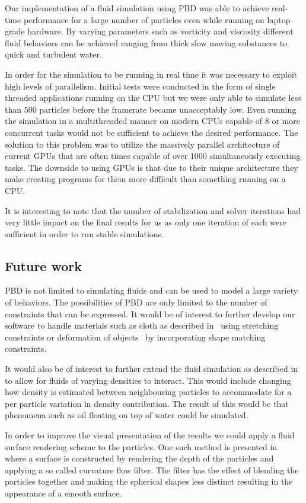 Our implementation of a fluid simulation using PBD was able
to achieve real-time performance for a large number of particles even while
running on laptop grade hardware. By varying parameters such as vorticity and
viscosity different fluid behaviors can be achieved ranging from thick slow
moving substances to quick and turbulent water.

In order for the simulation to be running in real time it was necessary to
exploit high levels of parallelism. Initial tests were conducted in the form
of single threaded applications running on the CPU but we were only able to
simulate less than 500 particles before the framerate became unacceptably low.
Even running the simulation in a multithreaded manner on modern CPUs capable of
8 or more concurrent tasks would not be sufficient to achieve the desired
performance. The solution to this problem was to utilize the massively parallel
architecture of current GPUs that are often times
capable of over 1000 simultaneously executing tasks. The downside to using GPUs
is that due to their unique architecture they make creating programs for them
more difficult than something running on a CPU.

It is interesting to note that the number of stabilization and solver iterations had very little impact on the final results for us as only one iteration of each were sufficient in order to run stable simulations.

\subsection{Future work}
PBD is not limited to simulating
fluids and can be used to model a large variety of behaviors. The possibilities
of PBD are only limited to the number of constraints that
can be expressed. It would be of interest to further develop our software to
handle materials such as cloth as described in~\cite{muller2007position} using
stretching constraints or deformation of objects~\cite{muller2005meshless} by
incorporating shape matching constraints.

It would also be of interest to further extend the fluid simulation as
described in~\cite{macklin2014unified} to allow for fluids of varying densities
to interact. This would include changing how density is estimated between
neighbouring particles to accommodate for a per particle variation in density
contribution. The result of this would be that phenomena such as oil floating
on top of water could be simulated.

In order to improve the visual presentation of the results we could apply a
fluid surface rendering scheme to the particles. One such method is presented
in~\cite{van2009screen} where a surface is constructed by rendering the depth
of the particles and applying a so called curvature flow filter. The filter has
the effect of blending the particles together and making the spherical shapes
less distinct resulting in the appearance of a smooth surface.
